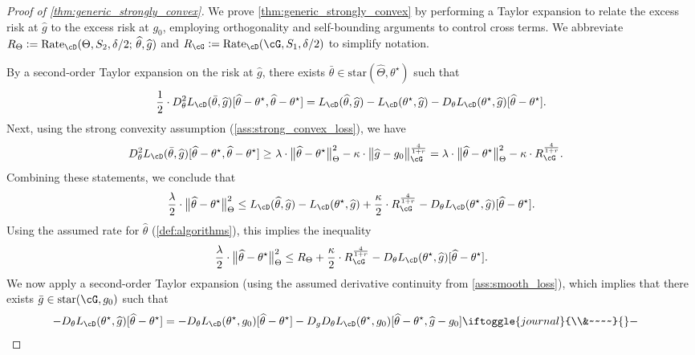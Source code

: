 \documentclass[11pt]{article} %
\newcommand{\journal}[1]{\iftoggle{journal}{#1}{}}
\newcommand{\pref}[1]{\cref{#1}}
\newcommand{\pfref}[1]{Proof of \pref{#1}}
\theoremstyle{theorem}  %
\theoremstyle{plain}
\DeclarePairedDelimiter{\nrm}{\|}{\|}
\newcommand{\ldef}{\vcentcolon=}
\newcommand{\wh}[1]{\widehat{#1}}
\newenvironment{revone}{\color{black}}{\ignorespacesafterend}
\newcommand{\midsem}{;\,}
\newcommand{\poprisk}{L_{\cD}}
\newcommand{\starhull}{\mathrm{star}}
\newcommand{\estone}{\wh{g}}
\newcommand{\esttwo}{\wh{\theta}}
\newcommand{\nuisance}{\cG}
\newcommand{\target}{\Theta}
\newcommand{\targetemp}{\wh{\Theta}}
\newcommand{\Rate}{\mathrm{Rate}_{\cD}}
\newcommand{\besttwo}{\theta^{\star}}
\newcommand{\gtone}{g_0}
\newcommand{\sampleone}{S_1}
\newcommand{\sampletwo}{S_2}
\begin{document}
\begin{revone}
\begin{proof}[\pfref{thm:generic_strongly_convex}]
We prove \pref{thm:generic_strongly_convex} by performing a Taylor
expansion to relate the excess risk at $\estone$ to the excess risk at
$\gtone$, employing orthogonality and self-bounding arguments to control
cross terms. We abbreviate
$R_{\Theta}\ldef\Rate(\target,\sampletwo,\delta/2\midsem{}\esttwo,\estone)$ and
$R_{\cG}\ldef\Rate(\nuisance,\sampleone,\delta/2)$ to simplify notation.

By a second-order Taylor expansion on the risk at $\estone$, there exists $\bar{\theta}\in\starhull(\targetemp, \besttwo)$ such that
\[
\frac{1}{2}\cdot{}D^{2}_{\theta}\poprisk(\bar{\theta},\estone)[\esttwo-\besttwo,\esttwo-\besttwo]
= \poprisk(\esttwo,\estone) - \poprisk(\besttwo,\estone) - D_{\theta}L_{\cD}(\besttwo,\estone)[\esttwo-\besttwo].
\]
Next, using the strong convexity assumption (\pref{ass:strong_convex_loss}), we have
\begin{align*}
D^{2}_{\theta}\poprisk(\bar{\theta},\estone)[\esttwo-\besttwo,\esttwo-\besttwo] 
\geq~& \lambda \cdot{}\nrm[\big]{\esttwo-\besttwo}_{\target}^{2} - \kappa \cdot \nrm[\big]{\estone - \gtone}_{\nuisance}^\frac{4}{1+r} = \lambda \cdot{}\nrm[\big]{\esttwo-\besttwo}_{\target}^{2} - \kappa\cdot{}R_{\cG}^\frac{4}{1+r}.
\end{align*}
Combining these statements, we conclude that
\[
\frac{\lambda}{2}\cdot{}\nrm[\big]{\esttwo-\besttwo}_{\target}^{2} \leq \poprisk(\esttwo,\estone) - \poprisk(\besttwo,\estone)  + \frac{\kappa}{2}\cdot R_{\cG}^{\frac{4}{1+r}} - D_{\theta}L_{\cD}(\besttwo,\estone)[\esttwo-\besttwo].
\]
Using the assumed rate for $\esttwo$ (\pref{def:algorithms}), this implies the inequality
\begin{equation}
\label{eq:generic_strongly_convex_lower}
\frac{\lambda}{2}\cdot{}\nrm[\big]{\esttwo-\besttwo}_{\target}^{2}
\leq{} R_{\Theta} + \frac{\kappa}{2}\cdot R_{\cG}^{\frac{4}{1+r}} - D_{\theta}L_{\cD}(\besttwo,\estone)[\esttwo-\besttwo].
\end{equation}
We now apply a second-order Taylor expansion (using the assumed derivative continuity from \pref{ass:smooth_loss}), which implies that there exists $\bar{g}\in\starhull(\nuisance,\gtone)$ such that
\begin{align*}
- D_{\theta}\poprisk(\besttwo,\estone)[\esttwo-\besttwo] 
&=
- D_{\theta}\poprisk(\besttwo,\gtone)[\esttwo-\besttwo] - D_{g}D_{\theta}\poprisk(\besttwo,\gtone)[\esttwo-\besttwo,\estone-\gtone]
\journal{\\&~~~~}-

\end{align*}
\end{proof}
\end{revone}
\end{document}
